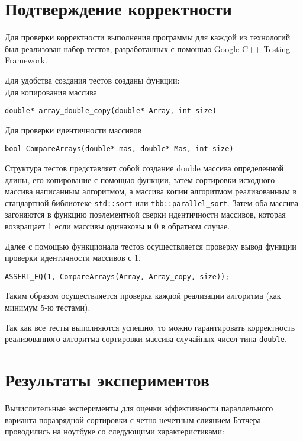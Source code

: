\documentclass{article}
\begin{document}
\newpage

\section{Подтверждение корректности}
Для проверки корректности выполнения программы для каждой из технологий был реализован набор тестов, разработанных с помощью Google C++ Testing Framework.

Для удобства создания тестов созданы функции:\\
Для копирования массива
\vspace{10pt}
\begin{lstlisting}
double* array_double_copy(double* Array, int size)
\end{lstlisting}
\vspace{-25pt}
Для проверки идентичности массивов
\vspace{10pt}
\begin{lstlisting}
bool CompareArrays(double* mas, double* Mas, int size)
\end{lstlisting}
\vspace{-25pt}

Структура тестов представляет собой создание double массива определенной длины, его копирование с помощью функции, затем сортировки исходного массива написанным алгоритмом, а массива копии алгоритмом реализованным в стандартной библиотеке \verb|std::sort| или \verb|tbb::parallel_sort|. Затем оба массива загоняются в функцию поэлементной сверки идентичности массивов, которая возвращает 1 если массивы одинаковы и 0 в обратном случае.

\par Далее с помощью функционала тестов осуществляется проверку вывод функции проверки идентичности массивов с 1.
\vspace{10pt}
\begin{lstlisting}
ASSERT_EQ(1, CompareArrays(Array, Array_copy, size));
\end{lstlisting}
\vspace{-25pt}

\par Таким образом осуществляется проверка каждой реализации алгоритма (как минимум 5-ю тестами).

Так как все тесты выполняются успешно, то можно гарантировать корректность реализованного алгоритма сортировки массива случайных чисел типа \verb|double|.
\newpage

\section{Результаты экспериментов}
Вычислительные эксперименты для оценки эффективности параллельного варианта поразрядной сортировки с четно-нечетным слиянием Бэтчера проводились на ноутбуке со следующими характеристиками:
\end{document}
